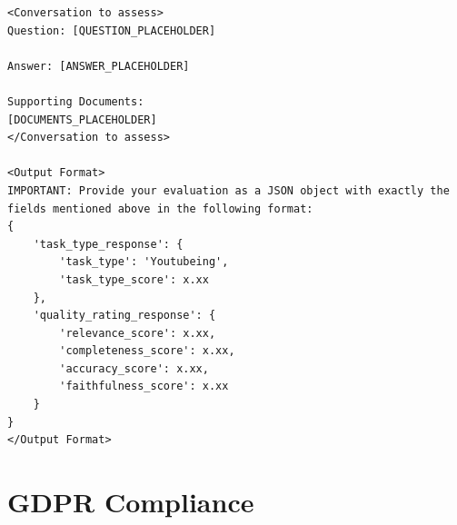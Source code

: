 \documentclass[
	english,
	ruledheaders=section,%
	class=report,%
	thesis={type=bachelor},%
	accentcolor=1b,%
	custommargins=true,%
	marginpar=false,%
	parskip=half-,%
	fontsize=11pt,%
	DIV=14,
]{tudapub}
\begin{document}
\begin{lstlisting}[caption={Prompt Template for AI Interaction Evaluation}, label={lst:prompt_template}]
<Conversation to assess>
Question: [QUESTION_PLACEHOLDER]

Answer: [ANSWER_PLACEHOLDER]

Supporting Documents:
[DOCUMENTS_PLACEHOLDER]
</Conversation to assess>

<Output Format>
IMPORTANT: Provide your evaluation as a JSON object with exactly the fields mentioned above in the following format:
{
    'task_type_response': {
        'task_type': 'Youtubeing',
        'task_type_score': x.xx
    },
    'quality_rating_response': {
        'relevance_score': x.xx,
        'completeness_score': x.xx,
        'accuracy_score': x.xx,
        'faithfulness_score': x.xx
    }
}
</Output Format>
\end{lstlisting}

\section{GDPR Compliance}
\end{document}
